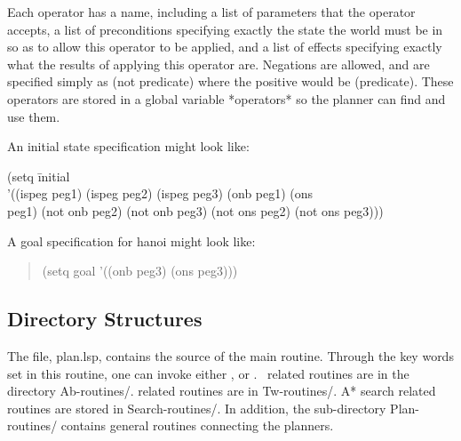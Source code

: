 Each operator has a name, including a list of parameters that the
operator accepts, a list of preconditions specifying exactly the state
the world must be in so as to allow this operator to be applied, and a
list of effects specifying exactly what the results of applying this
operator are.  Negations are allowed, and are specified simply as (not
predicate) where the positive would be (predicate). These operators
are stored in a global variable *operators* so the planner can find
and use them.


An initial state specification might look like:

\begin{tabbing}
(setq \=initial \\
\>	'((ispeg peg1) (ispeg peg2) (ispeg peg3) (onb peg1) (ons\\
\>	peg1) (not onb peg2) (not onb peg3) (not ons peg2) (not ons peg3)))\\
\end{tabbing}

A goal specification for hanoi might look like:
\begin{quote}
(setq goal '((onb peg3) (ons peg3)))
\end{quote}

\subsection{Directory Structures}
The file, plan.lsp, contains the source of the main routine.  Through
the key words set in this routine, one can invoke either \abtweak, or
\tweak.  \abtweak\ related routines are in the directory Ab-routines/.
\tweak related routines are in Tw-routines/.  A* search related
routines are stored in Search-routines/.  In addition, the sub-directory
Plan-routines/ contains general routines connecting the planners.

